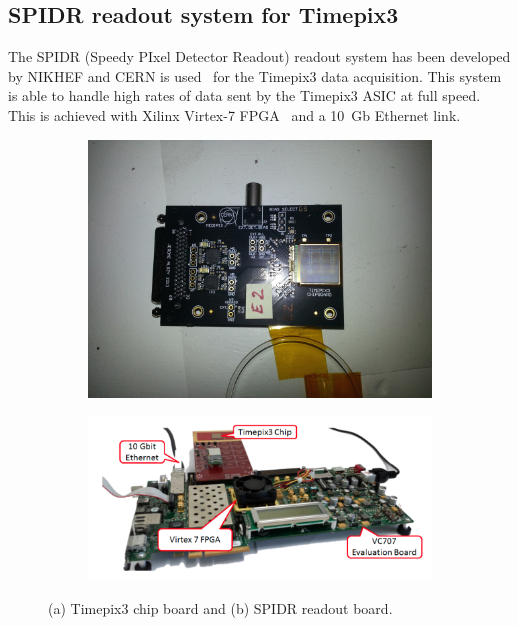 \subsection{SPIDR readout system for Timepix3}\label{sec:TimepixReadout}

The SPIDR (Speedy PIxel Detector Readout) readout system has been
developed by NIKHEF and CERN is used~\cite{Visser:2015bsa} for the
Timepix3 data acquisition. This system is able to handle high rates of
data sent by the Timepix3 ASIC at full speed. This is achieved with
Xilinx Virtex-7 FPGA~\cite{XilinxVirtex7} and a 10~Gb Ethernet link.

\begin{figure}[htbp] \centering
  \begin{subfigure}[b]{0.3\textwidth}
    \includegraphics[width=\textwidth]{./figures/Calibration/Timepix3board.jpg}
    \caption{}\label{fig:Timepix3board_PCB}
  \end{subfigure}\hfill
  \begin{subfigure}[b]{0.65\textwidth}
    \includegraphics[width=\textwidth]{./figures/Calibration/SPIDRboard.png}
    \caption{}
  \end{subfigure}
  \caption{(a) Timepix3 chip board and (b) SPIDR readout board.}
  \label{fig:Timepix3board_SPIDR}
\end{figure}

